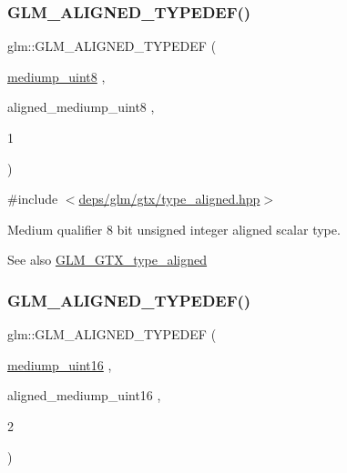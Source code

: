 \subsubsection{\texorpdfstring{G\+L\+M\+\_\+\+A\+L\+I\+G\+N\+E\+D\+\_\+\+T\+Y\+P\+E\+D\+E\+F()}{GLM\_ALIGNED\_TYPEDEF()}\hspace{0.1cm}{\footnotesize\ttfamily [81/209]}}
{\footnotesize\ttfamily glm\+::\+G\+L\+M\+\_\+\+A\+L\+I\+G\+N\+E\+D\+\_\+\+T\+Y\+P\+E\+D\+EF (\begin{DoxyParamCaption}\item[{\hyperlink{group__gtc__type__precision_gac4b849eaac0543a10f97f4bdda4850a8}{mediump\+\_\+uint8}}]{,  }\item[{aligned\+\_\+mediump\+\_\+uint8}]{,  }\item[{1}]{ }\end{DoxyParamCaption})}



{\ttfamily \#include $<$\hyperlink{gtx_2type__aligned_8hpp}{deps/glm/gtx/type\+\_\+aligned.\+hpp}$>$}

Medium qualifier 8 bit unsigned integer aligned scalar type. \begin{DoxySeeAlso}{See also}
\hyperlink{group__gtx__type__aligned}{G\+L\+M\+\_\+\+G\+T\+X\+\_\+type\+\_\+aligned} 
\end{DoxySeeAlso}
\mbox{\label{group__gtx__type__aligned_ga727e2bf2c433bb3b0182605860a48363}} 
\subsubsection{\texorpdfstring{G\+L\+M\+\_\+\+A\+L\+I\+G\+N\+E\+D\+\_\+\+T\+Y\+P\+E\+D\+E\+F()}{GLM\_ALIGNED\_TYPEDEF()}\hspace{0.1cm}{\footnotesize\ttfamily [82/209]}}
{\footnotesize\ttfamily glm\+::\+G\+L\+M\+\_\+\+A\+L\+I\+G\+N\+E\+D\+\_\+\+T\+Y\+P\+E\+D\+EF (\begin{DoxyParamCaption}\item[{\hyperlink{group__gtc__type__precision_ga2cef3a0d7b0fce75c9885f64656d8933}{mediump\+\_\+uint16}}]{,  }\item[{aligned\+\_\+mediump\+\_\+uint16}]{,  }\item[{2}]{ }\end{DoxyParamCaption})}



